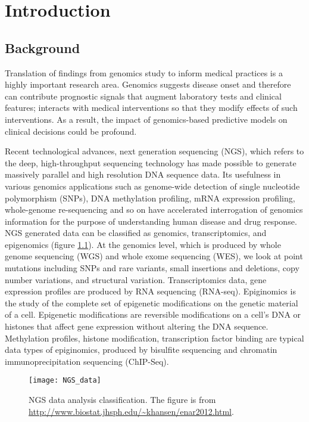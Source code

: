 \chapter{Introduction}
\label{cha:introduction}

\section{Background}
\label{sec:Background}

Translation of findings from genomics study to inform medical practices is a highly important research area. Genomics suggests disease onset and therefore can contribute prognostic signals that augment laboratory tests and clinical features; interacts with medical interventions so that they modify effects of such interventions. As a result, the impact of genomics-based predictive models on clinical decisions could be profound. 

Recent technological advances, next generation sequencing (NGS), which refers to the deep, high-throughput sequencing technology has made possible to generate massively parallel and high resolution DNA sequence data. Its usefulness in various genomics applications such as genome-wide detection of single nucleotide polymorphism (SNPs), DNA methylation profiling, mRNA expression profiling, whole-genome re-sequencing and so on have accelerated interrogation of genomics information for the purpose of understanding human disease and drug response. NGS generated data can be classified as genomics, transcriptomics, and epigenomics (figure \ref{fig:NGS_data}). At the genomics level, which is produced by whole genome sequencing (WGS) and whole exome sequencing (WES), we look at point mutations including SNPs and rare variants, small insertions and deletions, copy number variations, and structural variation. Transcriptomics data, gene expression profiles are produced by RNA sequencing (RNA-seq). Epiginomics is the study of the complete set of epigenetic modifications on the genetic material of a cell. Epigenetic modifications are reversible modifications on a cell's DNA or histones that affect gene expression without altering the DNA sequence. Methylation profiles, histone modification, transcription factor binding are typical data types of epiginomics, produced by bisulfite sequencing and chromatin immunoprecipitation sequencing (ChIP-Seq). 

\begin{figure}[tbh]
  \centering
  \texttt{[image: NGS\_data]}
  \caption[NGS data analysis classification]{
    NGS data analysis classification. The figure is from \url{http://www.biostat.jhsph.edu/~khansen/enar2012.html}.
  }
  \label{fig:NGS_data}
\end{figure}

